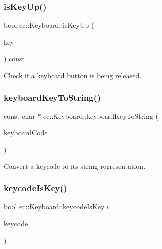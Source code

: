 \subsubsection{\texorpdfstring{is\+Key\+Up()}{isKeyUp()}}
{\footnotesize\ttfamily bool ec\+::\+Keyboard\+::is\+Key\+Up (\begin{DoxyParamCaption}\item[{\mbox{\hyperlink{classec_1_1_keyboard_a135ca08df15aebf8c93ce3cc76288a6e}{Keyboard\+::\+E\+C\+\_\+\+K\+E\+Y\+\_\+\+K\+E\+Y\+B\+O\+A\+RD}}}]{key }\end{DoxyParamCaption}) const}



Check if a keyboard button is being released. 

\mbox{\label{classec_1_1_keyboard_a5e986024ce4790af20b3198abce9b807}} 
\subsubsection{\texorpdfstring{keyboard\+Key\+To\+String()}{keyboardKeyToString()}}
{\footnotesize\ttfamily const char $\ast$ ec\+::\+Keyboard\+::keyboard\+Key\+To\+String (\begin{DoxyParamCaption}\item[{\mbox{\hyperlink{classec_1_1_keyboard_a135ca08df15aebf8c93ce3cc76288a6e}{E\+C\+\_\+\+K\+E\+Y\+\_\+\+K\+E\+Y\+B\+O\+A\+RD}}}]{keyboard\+Code }\end{DoxyParamCaption})\hspace{0.3cm}{\ttfamily [static]}}



Convert a keycode to its string representation. 

\mbox{\label{classec_1_1_keyboard_a8d048694060edbbb3cd6dba19d7eff24}} 
\subsubsection{\texorpdfstring{keycode\+Is\+Key()}{keycodeIsKey()}}
{\footnotesize\ttfamily bool ec\+::\+Keyboard\+::keycode\+Is\+Key (\begin{DoxyParamCaption}\item[{int}]{keycode }\end{DoxyParamCaption})\hspace{0.3cm}{\ttfamily [static]}}



